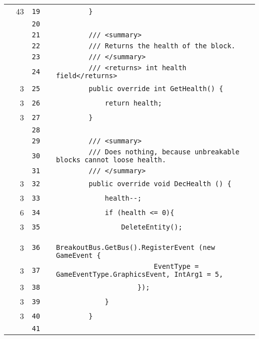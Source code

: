 \documentclass[a4paper,landscape,10pt]{article}
\begin{document}
\begin{longtable}[l]{lrrll}
\cellcolor{green} & 43 & \verb~19~ & & \verb~        }~\\
\cellcolor{gray} &  & \verb~20~ & & \verb~~\\
\cellcolor{gray} &  & \verb~21~ & & \verb~        /// <summary>~\\
\cellcolor{gray} &  & \verb~22~ & & \verb~        /// Returns the health of the block.~\\
\cellcolor{gray} &  & \verb~23~ & & \verb~        /// </summary>~\\
\cellcolor{gray} &  & \verb~24~ & & \verb~        /// <returns> int health field</returns>~\\
\cellcolor{green} & 3 & \verb~25~ & & \verb~        public override int GetHealth() {~\\
\cellcolor{green} & 3 & \verb~26~ & & \verb~            return health;~\\
\cellcolor{green} & 3 & \verb~27~ & & \verb~        }~\\
\cellcolor{gray} &  & \verb~28~ & & \verb~~\\
\cellcolor{gray} &  & \verb~29~ & & \verb~        /// <summary>~\\
\cellcolor{gray} &  & \verb~30~ & & \verb~        /// Does nothing, because unbreakable blocks cannot loose health.~\\
\cellcolor{gray} &  & \verb~31~ & & \verb~        /// </summary>~\\
\cellcolor{green} & 3 & \verb~32~ & & \verb~        public override void DecHealth () {~\\
\cellcolor{green} & 3 & \verb~33~ & & \verb~            health--;~\\
\cellcolor{green} & 6 & \verb~34~ & & \verb~            if (health <= 0){~\\
\cellcolor{green} & 3 & \verb~35~ & & \verb~                DeleteEntity();~\\
\cellcolor{green} & 3 & \verb~36~ & & \verb~                BreakoutBus.GetBus().RegisterEvent (new GameEvent {~\\
\cellcolor{green} & 3 & \verb~37~ & & \verb~                        EventType = GameEventType.GraphicsEvent, IntArg1 = 5,~\\
\cellcolor{green} & 3 & \verb~38~ & & \verb~                    });~\\
\cellcolor{green} & 3 & \verb~39~ & & \verb~            }~\\
\cellcolor{green} & 3 & \verb~40~ & & \verb~        }~\\
\cellcolor{gray} &  & \verb~41~ & & \verb~~\\

\end{longtable}
\end{document}
